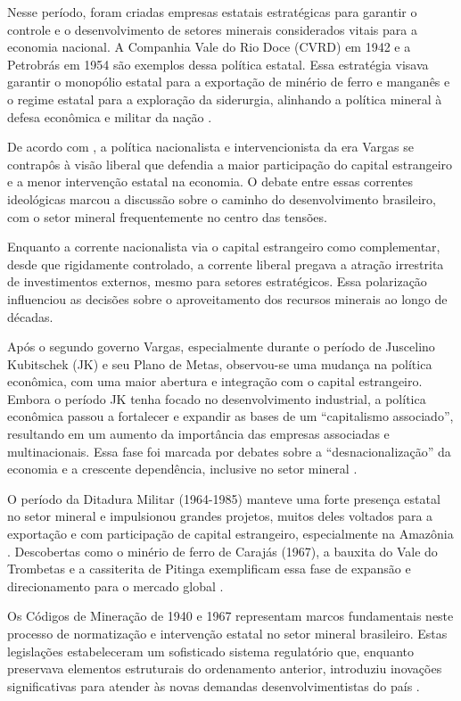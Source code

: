 Nesse período, foram criadas empresas estatais estratégicas para garantir o controle e o desenvolvimento de setores minerais considerados vitais para a economia nacional. A Companhia Vale do Rio Doce (CVRD) em 1942 e a Petrobrás em 1954 são exemplos dessa política estatal. Essa estratégia visava garantir o monopólio estatal para a exportação de minério de ferro e manganês e o regime estatal para a exploração da siderurgia, alinhando a política mineral à defesa econômica e militar da nação \cite{villasboas1995, fonseca2012}.

De acordo com \citeauthor{villasboas1995} \citeyear{villasboas1995}, a política nacionalista e intervencionista da era Vargas se contrapôs à visão liberal que defendia a maior participação do capital estrangeiro e a menor intervenção estatal na economia. O debate entre essas correntes ideológicas marcou a discussão sobre o caminho do desenvolvimento brasileiro, com o setor mineral frequentemente no centro das tensões. 

Enquanto a corrente nacionalista via o capital estrangeiro como complementar, desde que rigidamente controlado, a corrente liberal pregava a atração irrestrita de investimentos externos, mesmo para setores estratégicos. Essa polarização influenciou as decisões sobre o aproveitamento dos recursos minerais ao longo de décadas.

Após o segundo governo Vargas, especialmente durante o período de Juscelino Kubitschek (JK) e seu Plano de Metas, observou-se uma mudança na política econômica, com uma maior abertura e integração com o capital estrangeiro. Embora o período JK tenha focado no desenvolvimento industrial, a política econômica passou a fortalecer e expandir as bases de um ``capitalismo associado'', resultando em um aumento da importância das empresas associadas e multinacionais. Essa fase foi marcada por debates sobre a ``desnacionalização'' da economia e a crescente dependência, inclusive no setor mineral \cite{villasboas1995}.

O período da Ditadura Militar (1964-1985) manteve uma forte presença estatal no setor mineral e impulsionou grandes projetos, muitos deles voltados para a exportação e com participação de capital estrangeiro, especialmente na Amazônia \cite{fernandes2016, domingues2022}. Descobertas como o minério de ferro de Carajás (1967), a bauxita do Vale do Trombetas e a cassiterita de Pitinga exemplificam essa fase de expansão e direcionamento para o mercado global \cite{fernandes2016}. 

Os Códigos de Mineração de 1940 e 1967 \cite{brasil1967} representam marcos fundamentais neste processo de normatização e intervenção estatal no setor mineral brasileiro. Estas legislações estabeleceram um sofisticado sistema regulatório que, enquanto preservava elementos estruturais do ordenamento anterior, introduziu inovações significativas para atender às novas demandas desenvolvimentistas do país \cite{domingues2022}.


